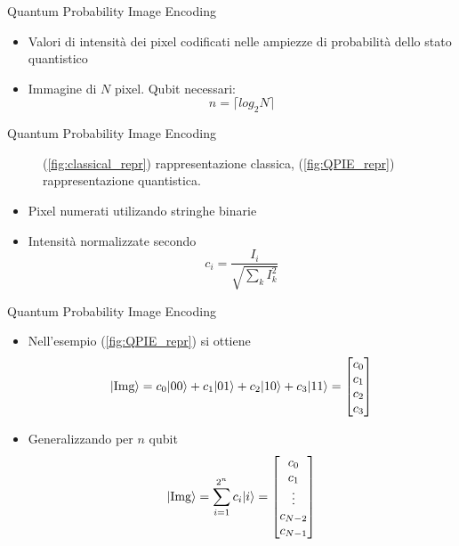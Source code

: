 \begin{frame}{Quantum Probability Image Encoding}
	\begin{itemize}
		\item Valori di intensità dei pixel codificati nelle ampiezze di
		probabilità dello stato quantistico
		\item Immagine di $N$ pixel. Qubit necessari:
		\[
		n = \lceil{log_2{N}}\rceil
		\]
	\end{itemize}
\end{frame}

\begin{frame}{Quantum Probability Image Encoding}
	\begin{figure}
		\centering
		\caption{(\ref{fig:classical_repr}) rappresentazione classica, (\ref{fig:QPIE_repr}) rappresentazione quantistica.}
	\end{figure}

	\begin{itemize}
		\item Pixel numerati utilizando stringhe binarie
		\item Intensità normalizzate secondo
		\[
		c_i = \frac{I_i}{\sqrt{\sum_{k}^{}{I_{k}^2}}}
		\]
	\end{itemize}
\end{frame}

\begin{frame}{Quantum Probability Image Encoding}
	\begin{itemize}
		\item Nell'esempio
		(\ref{fig:QPIE_repr})
		si ottiene
		\[
		\lvert\text{Img}\rangle 
		= c_0 \lvert00\rangle + c_1 \lvert01\rangle + c_2 \lvert10\rangle + c_3 \lvert11\rangle
		= \begin{bmatrix}
			c_0\\c_1\\c_2\\c_3
		\end{bmatrix}
		\]
		\pause
		\item Generalizzando per $n$ qubit
		\[
		\lvert\text{Img}\rangle 
		= \sum_{i=1}^{2^n} c_i \lvert i\rangle
		= \begin{bmatrix}
			c_0\\c_1\\ \vdots\\c_{N-2}\\c_{N-1}
		\end{bmatrix}
		\]
	\end{itemize}

\end{frame}

